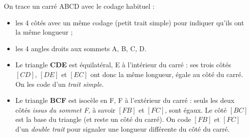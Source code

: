\documentclass[a4paper,11pt]{article}
\begin{document}
\smallskip

On trace un carré ABCD avec le codage habituel :
\begin{itemize}[leftmargin=1cm, itemsep=1pt]
  \item les 4 côtés avec un même codage (petit trait simple) pour indiquer qu'ils ont la même longueur ;
  \item les 4 angles droits aux sommets A, B, C, D.
\end{itemize}

\begin{itemize}[leftmargin=1cm, itemsep=1pt]
  \item Le triangle \textbf{CDE} est équilatéral, E à l'intérieur du carré : ses trois côtés $[CD]$, $[DE]$ et $[EC]$ ont donc la même longueur, égale au côté du carré. On les code d'un \emph{trait simple}.
  \item Le triangle \textbf{BCF} est isocèle en F, F à l'extérieur du carré : seuls les deux côtés \emph{issus du sommet F}, à savoir $[FB]$ et $[FC]$, sont égaux. Le côté $[BC]$ est la base du triangle (et reste un côté du carré). On code $[FB]$ et $[FC]$ d'un \emph{double trait} pour signaler une longueur différente du côté du carré.
\end{itemize}

\begin{center}
\end{center}
\end{document}
